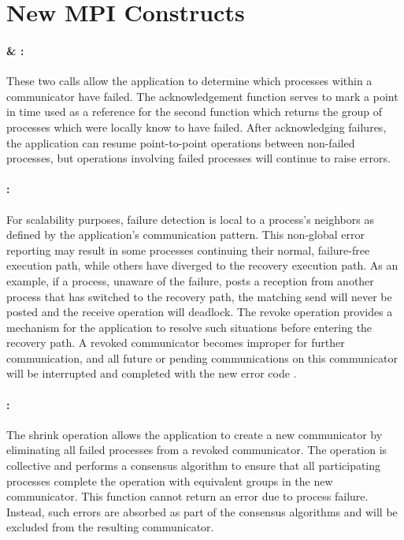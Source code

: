 \section{New MPI Constructs}
\label{sect:newmpi}

\paragraph{ \& :}\label{sect.ack}

These two calls allow the application to determine which processes within a
communicator have failed. The acknowledgement function serves to mark a point in
time used as a reference for the second function which returns the group of
processes which were locally know to have failed. After acknowledging failures,
the application can resume  point-to-point operations
between non-failed processes, but operations involving failed processes will
continue to raise errors.

\paragraph{:}

For scalability purposes, failure detection is local to a process's neighbors as
defined by the application's communication pattern. This non-global error
reporting may result in some processes continuing their normal, failure-free
execution path, while others have diverged to the recovery execution path. As an
example, if a process, unaware of the failure, posts a reception from another
process that has switched to the recovery path, the matching send will never be
posted and the receive operation will deadlock.  The revoke operation
provides a mechanism for the application to resolve such situations before
entering the recovery path. A revoked communicator becomes improper for further
communication, and all future or pending communications on this communicator
will be interrupted and completed with the new error code
.

\paragraph{:}

The shrink operation allows the application to create a new communicator by
eliminating all failed processes from a revoked communicator. The operation is
collective and performs a consensus algorithm to ensure that all participating
processes complete the operation with equivalent groups in the new communicator.
This function cannot return an error due to process failure. Instead, such
errors are absorbed as part of the consensus algorithms and will be excluded
from the resulting communicator.

